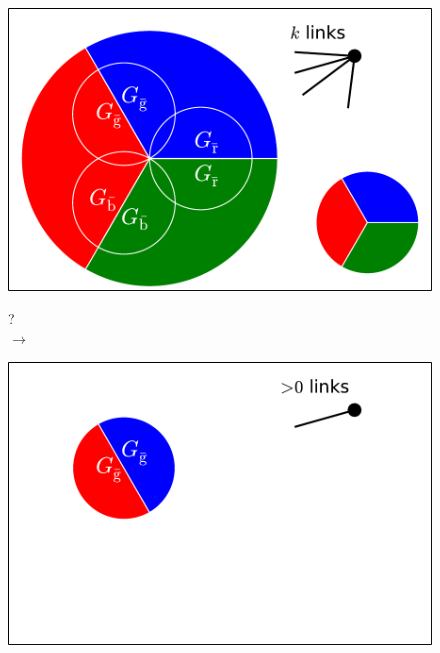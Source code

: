 \documentclass[aps, pre, onecolumn, a4paper, floatfix]{revtex4}
\begin{document}
\begin{figure}[htb]
  \begin{minipage}[b]{0.35\linewidth}
    \begin{center}
    \includegraphics[width=0.99\columnwidth]{sets_k_all.pdf}\\
      \vspace{40mm}
   \end{center}
  \end{minipage}
  \begin{minipage}[b]{0.1\linewidth}
    \begin{center}
      {\huge ?\\$\longrightarrow$\\}
      \vspace{60mm}
    \end{center}
  \end{minipage}
  \begin{minipage}[b]{0.35\linewidth}
    \begin{center}
    \includegraphics[width=0.99\columnwidth]{sets_k_gc_no_2.pdf}\\

\end{center}
\end{minipage}
\end{figure}
\end{document}
